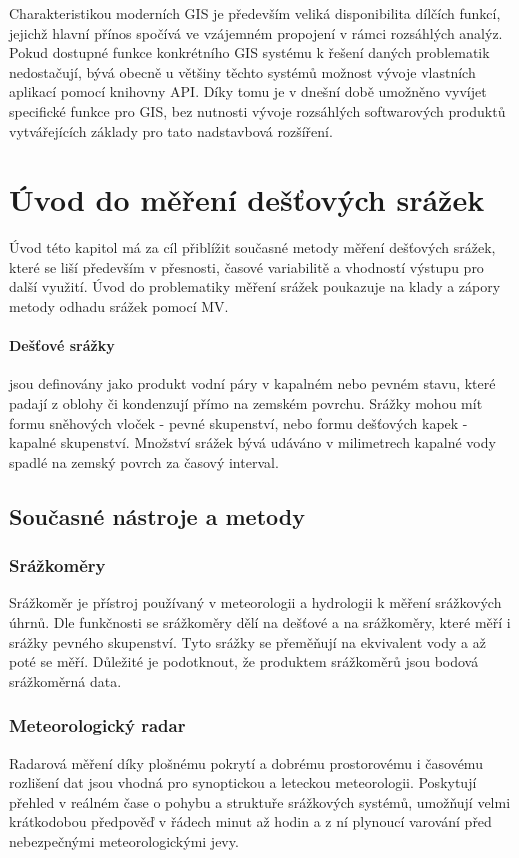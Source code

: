 \documentclass[a4paper,12pt,oneside]{report}
\begin{document}
Charakteristikou moderních GIS je především veliká disponibilita dílčích funkcí, jejichž hlavní přínos spočívá ve vzájemném propojení v rámci rozsáhlých analýz. Pokud dostupné funkce konkrétního GIS systému k řešení daných problematik nedostačují, bývá obecně u většiny těchto systémů  možnost vývoje vlastních aplikací pomocí knihovny \acs{API}. Díky tomu je v dnešní době umožněno vyvíjet specifické funkce pro GIS, bez nutnosti vývoje rozsáhlých softwarových produktů vytvářejících základy pro tato nadstavbová rozšíření.



\section{Úvod do měření dešťových srážek}
Úvod této kapitol má za cíl přiblížit současné metody měření dešťových srážek, které se liší především v přesnosti, časové variabilitě a vhodností výstupu pro další využití. Úvod do problematiky měření srážek poukazuje na klady a zápory metody odhadu srážek pomocí MV.


\paragraph*{Dešťové srážky}jsou definovány jako produkt vodní páry v kapalném nebo pevném stavu, které padají z oblohy či kondenzují přímo na zemském povrchu. Srážky mohou mít formu sněhových vloček - pevné skupenství, nebo formu dešťových kapek - kapalné skupenství. Množství srážek bývá udáváno v milimetrech kapalné vody spadlé na zemský povrch za časový interval.\cite{wmo} 

\subsection{Současné nástroje a metody }
\label{subsec:11}

\subsubsection{Srážkoměry}
Srážkoměr je přístroj používaný v meteorologii a hydrologii k měření srážkových úhrnů. Dle funkčnosti se srážkoměry dělí na dešťové a na srážkoměry, které měří i srážky pevného skupenství. Tyto srážky se přeměňují na ekvivalent vody a až poté se měří. Důležité je podotknout, že produktem srážkoměrů jsou bodová srážkoměrná data.

\subsubsection{Meteorologický radar}
Radarová měření díky plošnému pokrytí a dobrému prostorovému i časovému rozlišení dat jsou vhodná pro synoptickou a leteckou meteorologii. Poskytují přehled v reálném čase o pohybu a struktuře srážkových systémů, umožňují velmi krátkodobou předpověď v řádech minut až hodin a z ní plynoucí varování před nebezpečnými meteorologickými jevy.\cite{radar_chmu}
\end{document}

